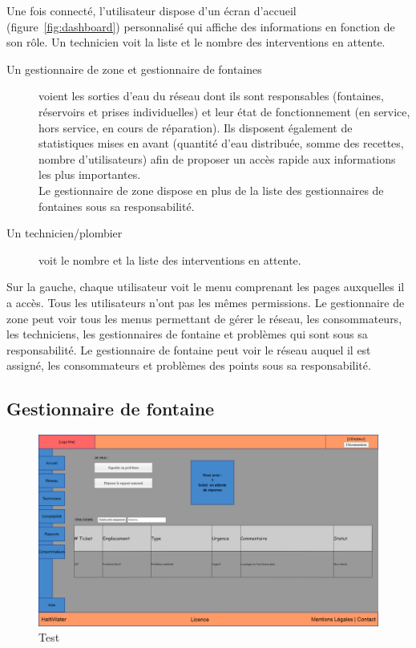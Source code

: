 \documentclass[a4paper, 11pt]{article}
\begin{document}
    Une fois connecté, l'utilisateur dispose d'un écran d'accueil (figure~\ref{fig:dashboard}) personnalisé qui affiche des informations en fonction de son rôle. Un technicien voit la liste et le nombre des interventions en attente.
    \begin{description}
      \item[Un gestionnaire de zone et gestionnaire de fontaines] voient les sorties d'eau du réseau dont ils sont responsables (fontaines, réservoirs et prises individuelles) et leur état de fonctionnement (en service, hors service, en cours de réparation). Ils disposent également de statistiques mises en avant (quantité d'eau distribuée, somme des recettes, nombre d'utilisateurs) afin de proposer un accès rapide aux informations les plus importantes.\\
      Le gestionnaire de zone dispose en plus de la liste des gestionnaires de fontaines sous sa responsabilité.
      \item[Un technicien/plombier] voit le nombre et la liste des interventions en attente.
    \end{description}
    Sur la gauche, chaque utilisateur voit le menu comprenant les pages auxquelles il a accès. Tous les utilisateurs n'ont pas les mêmes permissions. Le gestionnaire de zone peut voir tous les menus permettant de gérer le réseau, les consommateurs, les techniciens, les gestionnaires de fontaine et problèmes qui sont sous sa responsabilité. Le gestionnaire de fontaine peut voir le réseau auquel il est assigné, les consommateurs et problèmes des points sous sa responsabilité.


  \subsection{Gestionnaire de fontaine}
  \begin{figure}[H]
      \includegraphics[width=\textwidth]{Cahier_des_Charges/rapports}
      \caption{Test}
      \label{fig:reports}
  \end{figure}
\end{document}

